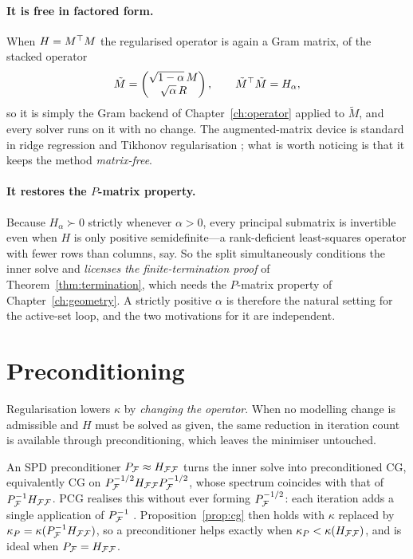 \paragraph{It is free in factored form.} When $H = M^{\top} M$ the regularised operator is
again a Gram matrix, of the stacked operator
\[
  \tilde{M} = \begin{pmatrix} \sqrt{1-\alpha}\,M \\ \sqrt{\alpha}\,R \end{pmatrix},
  \qquad \tilde{M}^{\top}\tilde{M} = H_\alpha,
\]
so it is simply the Gram backend of Chapter~\ref{ch:operator} applied to $\tilde M$,
and every solver runs on it with no change. The augmented-matrix device is standard in
ridge regression and Tikhonov regularisation \cite{golub2013,lawson1974}; what is worth
noticing is that it keeps the method \emph{matrix-free}.

\paragraph{It restores the $P$-matrix property.} Because $H_\alpha \succ 0$ strictly
whenever $\alpha > 0$, every principal submatrix is invertible even when $H$ is only
positive semidefinite---a rank-deficient least-squares operator with fewer rows than
columns, say. So the split simultaneously conditions the inner solve and
\emph{licenses the finite-termination proof} of Theorem~\ref{thm:termination}, which
needs the $P$-matrix property of Chapter~\ref{ch:geometry}. A strictly positive
$\alpha$ is therefore the natural setting for the active-set loop, and the two
motivations for it are independent.

\section{Preconditioning}

Regularisation lowers $\kappa$ by \emph{changing the operator}. When no modelling
change is admissible and $H$ must be solved as given, the same reduction in iteration
count is available through preconditioning, which leaves the minimiser untouched.

An SPD preconditioner $P_{\mathcal{F}} \approx H_{\mathcal{F}\mathcal{F}}$ turns the inner solve into
preconditioned CG, equivalently CG on
$P_{\mathcal{F}}^{-1/2} H_{\mathcal{F}\mathcal{F}} P_{\mathcal{F}}^{-1/2}$, whose spectrum coincides with that of
$P_{\mathcal{F}}^{-1}H_{\mathcal{F}\mathcal{F}}$. PCG realises this without ever forming
$P_{\mathcal{F}}^{-1/2}$: each iteration adds a single application of $P_{\mathcal{F}}^{-1}$
\cite{golub2013,benzi2005}. Proposition~\ref{prop:cg} then holds with $\kappa$
replaced by $\kappa_P = \kappa(P_{\mathcal{F}}^{-1}H_{\mathcal{F}\mathcal{F}})$, so a preconditioner helps
exactly when $\kappa_P < \kappa(H_{\mathcal{F}\mathcal{F}})$, and is ideal when $P_{\mathcal{F}} =
H_{\mathcal{F}\mathcal{F}}$.


